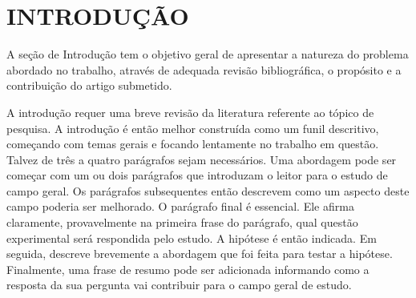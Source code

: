 %


\section{INTRODUÇÃO}


A seção de Introdução tem o objetivo geral de apresentar a natureza do problema abordado no trabalho, através de adequada revisão bibliográfica, o propósito e a contribuição do artigo submetido.

A introdução requer uma breve revisão da literatura referente ao tópico de pesquisa. A introdução é então melhor construída como um funil descritivo, começando com temas gerais e focando lentamente no trabalho em questão. Talvez de três a quatro parágrafos sejam necessários. Uma abordagem pode ser começar com um ou dois parágrafos que introduzam o leitor para o estudo de campo geral. Os parágrafos subsequentes então descrevem como um aspecto deste campo poderia ser melhorado. O parágrafo final é essencial. Ele afirma claramente, provavelmente na primeira frase do parágrafo, qual questão experimental será respondida pelo estudo. A hipótese é então indicada. Em seguida, descreve brevemente a abordagem que foi feita para testar a hipótese. Finalmente, uma frase de resumo pode ser adicionada informando como a resposta da sua pergunta vai contribuir para o campo geral de estudo.

